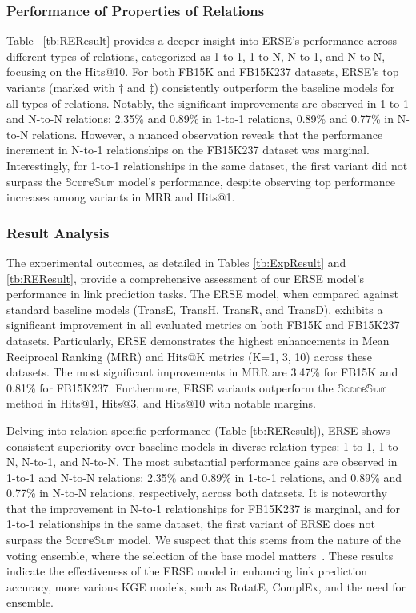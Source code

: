 \documentclass{article}
\begin{document}
\subsubsection{Performance of Properties of Relations}
Table ~\ref{tb:REResult} provides a deeper insight into ERSE's performance across different types of relations, categorized as 1-to-1, 1-to-N, N-to-1, and N-to-N, focusing on the Hits@10.  For both FB15K and FB15K237 datasets, ERSE's top variants (marked with $\dagger$ and $\ddagger$) consistently outperform the baseline models for all types of relations. Notably, the significant improvements are observed in 1-to-1 and N-to-N relations: 2.35\% and 0.89\% in 1-to-1 relations, 0.89\% and 0.77\% in N-to-N relations. However, a nuanced observation reveals that the performance increment in N-to-1 relationships on the FB15K237 dataset was marginal. Interestingly, for 1-to-1 relationships in the same dataset, the first variant did not surpass the $\mathbb{ScoreSum}$ model's performance, despite observing top performance increases among variants in MRR and Hits@1.

\subsubsection{Result Analysis}

The experimental outcomes, as detailed in Tables \ref{tb:ExpResult} and \ref{tb:REResult}, provide a comprehensive assessment of our ERSE model's performance in link prediction tasks. The ERSE model, when compared against standard baseline models (TransE, TransH, TransR, and TransD), exhibits a significant improvement in all evaluated metrics on both FB15K and FB15K237 datasets. Particularly, ERSE demonstrates the highest enhancements in Mean Reciprocal Ranking (MRR) and Hits@K metrics (K=1, 3, 10) across these datasets. The most significant improvements in MRR are 3.47\% for FB15K and 0.81\% for FB15K237. Furthermore, ERSE variants outperform the $\mathbb{ScoreSum}$ method in Hits@1, Hits@3, and Hits@10 with notable margins.

Delving into relation-specific performance (Table \ref{tb:REResult}), ERSE shows consistent superiority over baseline models in diverse relation types: 1-to-1, 1-to-N, N-to-1, and N-to-N. The most substantial performance gains are observed in 1-to-1 and N-to-N relations: 2.35\% and 0.89\% in 1-to-1 relations, and 0.89\% and 0.77\% in N-to-N relations, respectively, across both datasets. It is noteworthy that the improvement in N-to-1 relationships for FB15K237 is marginal, and for 1-to-1 relationships in the same dataset, the first variant of ERSE does not surpass the $\mathbb{ScoreSum}$ model. We suspect that this stems from the nature of the voting ensemble, where the selection of the base model matters~\cite{a13010026}. These results indicate the effectiveness of the ERSE model in enhancing link prediction accuracy, more various KGE models, such as RotatE, ComplEx, and the need for ensemble. 
\end{document}

